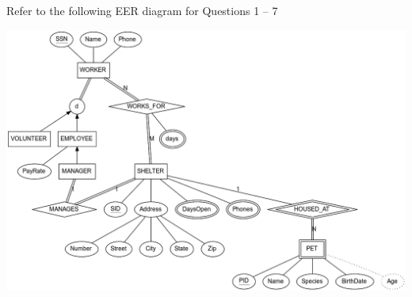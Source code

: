 \documentclass[10pt]{exam}
\begin{document}
\newpage

\newpage

\pointsinmargin
\bracketedpoints

\marginpointname{}

Refer to the following EER diagram for Questions 1 -- 7

\begin{center}
  \hspace{-.5in}\includegraphics[width=7in]{humane-society.png}
\end{center}

\newpage
\end{document}
